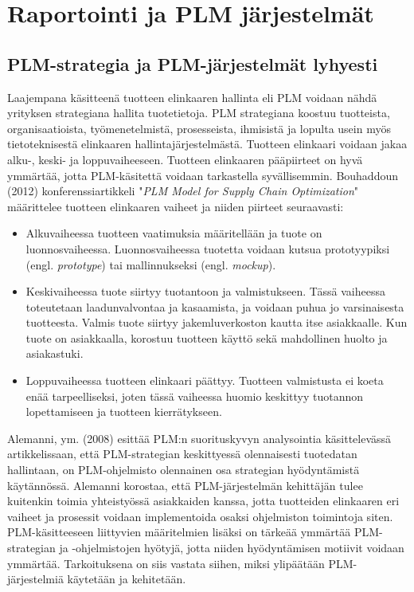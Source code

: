 \chapter{Raportointi ja PLM järjestelmät} \label{Raportointi ja PLM järjestelmät}

\section{PLM-strategia ja PLM-järjestelmät lyhyesti} \label{PLM-järjestelmät}

Laajempana käsitteenä tuotteen elinkaaren hallinta eli PLM voidaan nähdä yrityksen strategiana hallita tuotetietoja. PLM strategiana koostuu tuotteista, organisaatioista, työmenetelmistä, prosesseista, ihmisistä ja lopulta usein myös tietoteknisestä elinkaaren hallintajärjestelmästä.
Tuotteen elinkaari voidaan jakaa alku-, keski- ja loppuvaiheeseen. Tuotteen elinkaaren pääpiirteet on hyvä ymmärtää, jotta PLM-käsitettä voidaan tarkastella syvällisemmin. Bouhaddoun (2012) konferenssiartikkeli "\textit{PLM Model for Supply Chain Optimization}" määrittelee tuotteen elinkaaren vaiheet ja niiden piirteet seuraavasti: \cite{bouhaddou_plm_2012}

\begin{itemize}
	\item Alkuvaiheessa tuotteen vaatimuksia määritellään ja tuote on luonnosvaiheessa. Luonnosvaiheessa tuotetta voidaan kutsua prototyypiksi (engl. \textit{prototype}) tai mallinnukseksi (engl. \textit{mockup}).
	\item Keskivaiheessa tuote siirtyy tuotantoon ja valmistukseen. Tässä vaiheessa toteutetaan laadunvalvontaa ja kasaamista, ja voidaan puhua jo varsinaisesta tuotteesta. Valmis tuote siirtyy jakemluverkoston kautta itse asiakkaalle. Kun tuote on asiakkaalla, korostuu tuotteen käyttö sekä mahdollinen huolto ja asiakastuki.
	\item Loppuvaiheessa tuotteen elinkaari päättyy. Tuotteen valmistusta ei koeta enää tarpeelliseksi, joten tässä vaiheessa huomio keskittyy tuotannon lopettamiseen ja tuotteen kierrätykseen.
\end{itemize}

Alemanni, ym. (2008) esittää PLM:n suorituskyvyn analysointia käsittelevässä artikkelissaan, että PLM-strategian keskittyessä olennaisesti tuotedatan hallintaan, on PLM-ohjelmisto olennainen osa strategian hyödyntämistä käytännössä. \cite{alemanni_key_2008} Alemanni korostaa, että PLM-järjestelmän kehittäjän tulee kuitenkin toimia yhteistyössä asiakkaiden kanssa, jotta tuotteiden elinkaaren eri vaiheet ja prosessit voidaan implementoida osaksi ohjelmiston toimintoja siten. PLM-käsitteeseen liittyvien määritelmien lisäksi on tärkeää ymmärtää PLM-strategian ja -ohjelmistojen hyötyjä, jotta niiden hyödyntämisen motiivit voidaan ymmärtää. Tarkoituksena on siis vastata siihen, miksi ylipäätään PLM-järjestelmiä käytetään ja kehitetään.

